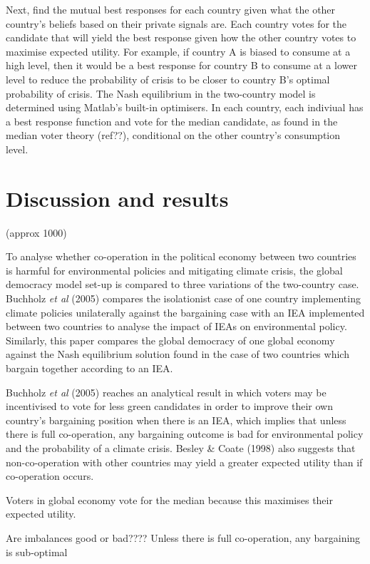 \documentclass[11pt,preprint, authoryear]{elsarticle}
\numberwithin{equation}{section}
\numberwithin{figure}{section}
\numberwithin{table}{section}
\begin{document}
Next, find the mutual best responses for each country given what the
other country's beliefs based on their private signals are. Each country
votes for the candidate that will yield the best response given how the
other country votes to maximise expected utility. For example, if
country A is biased to consume at a high level, then it would be a best
response for country B to consume at a lower level to reduce the
probability of crisis to be closer to country B's optimal probability of
crisis. The Nash equilibrium in the two-country model is determined
using Matlab's built-in optimisers. In each country, each indiviual has
a best response function and vote for the median candidate, as found in
the median voter theory (ref??), conditional on the other country's
consumption level.

\hypertarget{discussion-and-results}{%
\section{Discussion and results}\label{discussion-and-results}}

(approx 1000)

To analyse whether co-operation in the political economy between two
countries is harmful for environmental policies and mitigating climate
crisis, the global democracy model set-up is compared to three
variations of the two-country case. Buchholz \emph{et al} (2005)
compares the isolationist case of one country implementing climate
policies unilaterally against the bargaining case with an IEA
implemented between two countries to analyse the impact of IEAs on
environmental policy. Similarly, this paper compares the global
democracy of one global economy against the Nash equilibrium solution
found in the case of two countries which bargain together according to
an IEA.

Buchholz \emph{et al} (2005) reaches an analytical result in which
voters may be incentivised to vote for less green candidates in order to
improve their own country's bargaining position when there is an IEA,
which implies that unless there is full co-operation, any bargaining
outcome is bad for environmental policy and the probability of a climate
crisis. Besley \& Coate (1998) also suggests that non-co-operation with
other countries may yield a greater expected utility than if
co-operation occurs.

Voters in global economy vote for the median because this maximises
their expected utility.

Are imbalances good or bad???? Unless there is full co-operation, any
bargaining is sub-optimal
\end{document}
